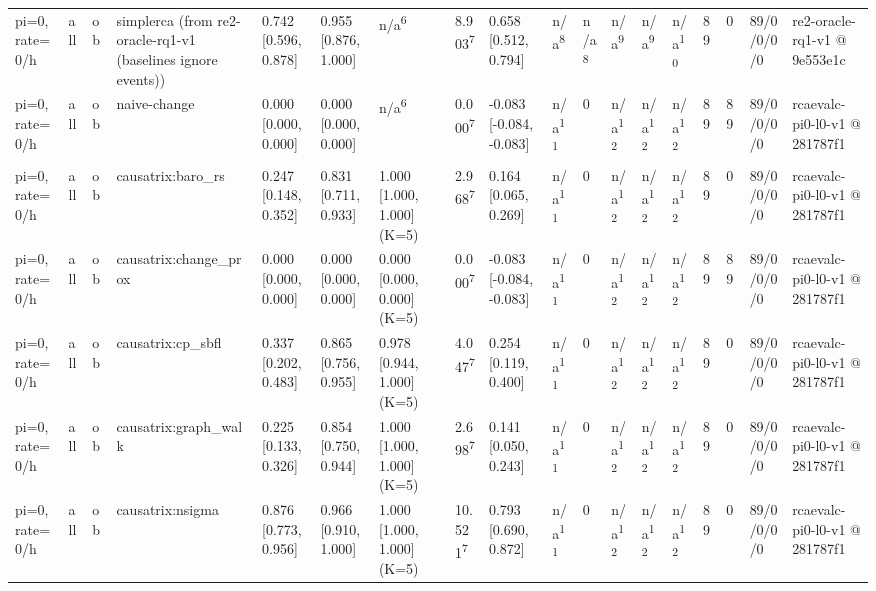 \begin{table}[t]
\begin{tabular}{llllllllllllllllll}
pi=0, rate=0/h & all & ob & simplerca (from re2-oracle-rq1-v1 (baselines ignore events)) & 0.742 [0.596, 0.878] & 0.955 [0.876, 1.000] & n/a\textsuperscript{6} & 8.903\textsuperscript{7} & 0.658 [0.512, 0.794] & n/a\textsuperscript{8} & n/a\textsuperscript{8} & n/a\textsuperscript{9} & n/a\textsuperscript{9} & n/a\textsuperscript{10} & 89 & 0 & 89/0/0/0/0 & re2-oracle-rq1-v1 @ 9e553e1c \\
pi=0, rate=0/h & all & ob & naive-change & 0.000 [0.000, 0.000] & 0.000 [0.000, 0.000] & n/a\textsuperscript{6} & 0.000\textsuperscript{7} & -0.083 [-0.084, -0.083] & n/a\textsuperscript{11} & 0 & n/a\textsuperscript{12} & n/a\textsuperscript{12} & n/a\textsuperscript{12} & 89 & 89 & 89/0/0/0/0 & rcaevalc-pi0-l0-v1 @ 281787f1 \\
pi=0, rate=0/h & all & ob & causatrix:baro\_rs & 0.247 [0.148, 0.352] & 0.831 [0.711, 0.933] & 1.000 [1.000, 1.000] (K=5) & 2.968\textsuperscript{7} & 0.164 [0.065, 0.269] & n/a\textsuperscript{11} & 0 & n/a\textsuperscript{12} & n/a\textsuperscript{12} & n/a\textsuperscript{12} & 89 & 0 & 89/0/0/0/0 & rcaevalc-pi0-l0-v1 @ 281787f1 \\
pi=0, rate=0/h & all & ob & causatrix:change\_prox & 0.000 [0.000, 0.000] & 0.000 [0.000, 0.000] & 0.000 [0.000, 0.000] (K=5) & 0.000\textsuperscript{7} & -0.083 [-0.084, -0.083] & n/a\textsuperscript{11} & 0 & n/a\textsuperscript{12} & n/a\textsuperscript{12} & n/a\textsuperscript{12} & 89 & 89 & 89/0/0/0/0 & rcaevalc-pi0-l0-v1 @ 281787f1 \\
pi=0, rate=0/h & all & ob & causatrix:cp\_sbfl & 0.337 [0.202, 0.483] & 0.865 [0.756, 0.955] & 0.978 [0.944, 1.000] (K=5) & 4.047\textsuperscript{7} & 0.254 [0.119, 0.400] & n/a\textsuperscript{11} & 0 & n/a\textsuperscript{12} & n/a\textsuperscript{12} & n/a\textsuperscript{12} & 89 & 0 & 89/0/0/0/0 & rcaevalc-pi0-l0-v1 @ 281787f1 \\
pi=0, rate=0/h & all & ob & causatrix:graph\_walk & 0.225 [0.133, 0.326] & 0.854 [0.750, 0.944] & 1.000 [1.000, 1.000] (K=5) & 2.698\textsuperscript{7} & 0.141 [0.050, 0.243] & n/a\textsuperscript{11} & 0 & n/a\textsuperscript{12} & n/a\textsuperscript{12} & n/a\textsuperscript{12} & 89 & 0 & 89/0/0/0/0 & rcaevalc-pi0-l0-v1 @ 281787f1 \\
pi=0, rate=0/h & all & ob & causatrix:nsigma & 0.876 [0.773, 0.956] & 0.966 [0.910, 1.000] & 1.000 [1.000, 1.000] (K=5) & 10.521\textsuperscript{7} & 0.793 [0.690, 0.872] & n/a\textsuperscript{11} & 0 & n/a\textsuperscript{12} & n/a\textsuperscript{12} & n/a\textsuperscript{12} & 89 & 0 & 89/0/0/0/0 & rcaevalc-pi0-l0-v1 @ 281787f1 \\

\end{tabular}
\end{table}
